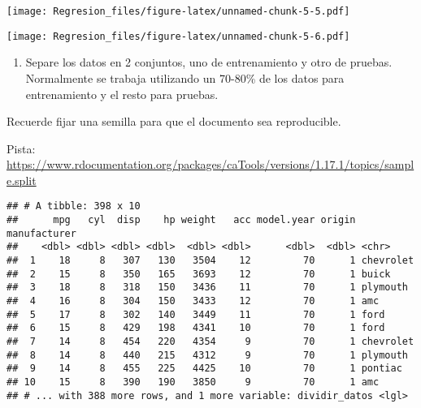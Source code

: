 \documentclass[]{article}
\newenvironment{Shaded}{\begin{snugshade}}{\end{snugshade}}
\newcommand{\CommentTok}[1]{\textcolor[rgb]{0.56,0.35,0.01}{\textit{#1}}}
\newcommand{\DataTypeTok}[1]{\textcolor[rgb]{0.13,0.29,0.53}{#1}}
\newcommand{\DecValTok}[1]{\textcolor[rgb]{0.00,0.00,0.81}{#1}}
\newcommand{\FloatTok}[1]{\textcolor[rgb]{0.00,0.00,0.81}{#1}}
\newcommand{\KeywordTok}[1]{\textcolor[rgb]{0.13,0.29,0.53}{\textbf{#1}}}
\newcommand{\NormalTok}[1]{#1}
\newcommand{\OperatorTok}[1]{\textcolor[rgb]{0.81,0.36,0.00}{\textbf{#1}}}
\newcommand{\StringTok}[1]{\textcolor[rgb]{0.31,0.60,0.02}{#1}}
\providecommand{\tightlist}{%
  \setlength{\itemsep}{0pt}\setlength{\parskip}{0pt}}
\begin{document}
\texttt{[image: Regresion\_files/figure-latex/unnamed-chunk-5-5.pdf]}

\begin{Shaded}
\end{Shaded}

\texttt{[image: Regresion\_files/figure-latex/unnamed-chunk-5-6.pdf]}

\begin{enumerate}
\def\labelenumi{\arabic{enumi}.}
\setcounter{enumi}{2}
\tightlist
\item
  Separe los datos en 2 conjuntos, uno de entrenamiento y otro de
  pruebas. Normalmente se trabaja utilizando un 70-80\% de los datos
  para entrenamiento y el resto para pruebas.
\end{enumerate}

Recuerde fijar una semilla para que el documento sea reproducible.

Pista:
\url{https://www.rdocumentation.org/packages/caTools/versions/1.17.1/topics/sample.split}

\begin{Shaded}
\end{Shaded}

\begin{verbatim}
## # A tibble: 398 x 10
##      mpg   cyl  disp    hp weight   acc model.year origin manufacturer
##    <dbl> <dbl> <dbl> <dbl>  <dbl> <dbl>      <dbl>  <dbl> <chr>       
##  1    18     8   307   130   3504    12         70      1 chevrolet   
##  2    15     8   350   165   3693    12         70      1 buick       
##  3    18     8   318   150   3436    11         70      1 plymouth    
##  4    16     8   304   150   3433    12         70      1 amc         
##  5    17     8   302   140   3449    11         70      1 ford        
##  6    15     8   429   198   4341    10         70      1 ford        
##  7    14     8   454   220   4354     9         70      1 chevrolet   
##  8    14     8   440   215   4312     9         70      1 plymouth    
##  9    14     8   455   225   4425    10         70      1 pontiac     
## 10    15     8   390   190   3850     9         70      1 amc         
## # ... with 388 more rows, and 1 more variable: dividir_datos <lgl>
\end{verbatim}
\end{document}
